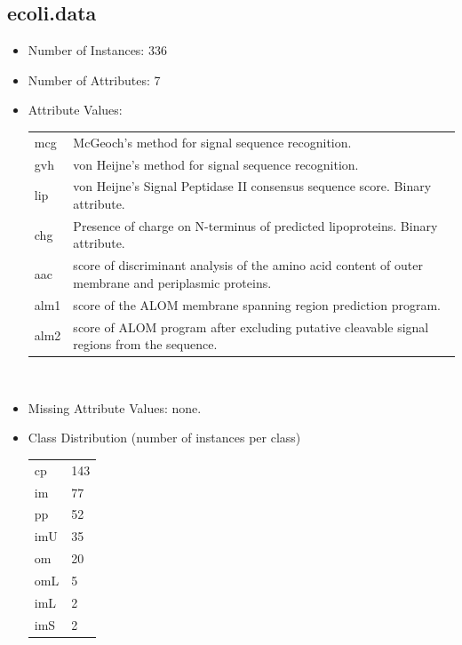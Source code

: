 \documentclass[10pt]{report}
\begin{document}
\subsection*{ecoli.data}
\begin{itemize}
\item Number of Instances:  336
\item Number of Attributes: 7 
\item Attribute Values:
  \\
  \begin{left}
    \begin{tabular}{ l p{10cm} }
      mcg  &   McGeoch's method for signal sequence recognition. \\
      gvh  &   von Heijne's method for signal sequence recognition. \\
      lip  &   von Heijne's Signal Peptidase II consensus sequence score. Binary attribute. \\
      chg  &   Presence of charge on N-terminus of predicted lipoproteins. Binary attribute. \\
      aac  &   score of discriminant analysis of the amino acid content of outer membrane and periplasmic proteins. \\
      alm1 &   score of the ALOM membrane spanning region prediction program. \\
      alm2 &   score of ALOM program after excluding putative cleavable signal regions from the sequence. \\
    \end{tabular}
  \end{left}
  \\   
\item Missing Attribute Values: none.
\item Class Distribution (number of instances per class)
  \\
  \begin{left}
    \begin{tabular}{ l l }
      cp    &      143 \\
      im    &       77 \\               
      pp    &       52 \\
      imU   &       35 \\
      om    &       20 \\
      omL   &        5 \\
      imL   &        2 \\
      imS   &        2 \\
    \end{tabular}
  \end{left}
\end{itemize}
\end{document}
